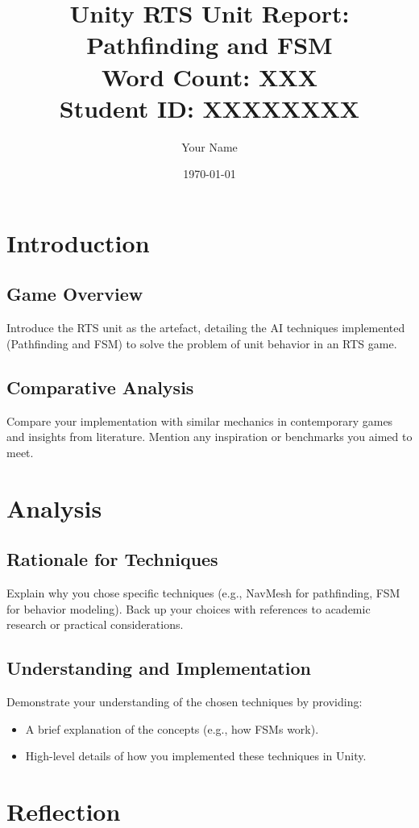 \documentclass[a4paper,12pt]{article}
\title{Unity RTS Unit Report: Pathfinding and FSM \\ \small Word Count: XXX \\ Student ID: XXXXXXXX}
\author{Your Name}
\date{\today}
\begin{document}
\maketitle
\tableofcontents
\newpage

\section{Introduction}
\subsection{Game Overview}
Introduce the RTS unit as the artefact, detailing the AI techniques implemented (Pathfinding and FSM) to solve the problem of unit behavior in an RTS game.

\subsection{Comparative Analysis}
Compare your implementation with similar mechanics in contemporary games and insights from literature. Mention any inspiration or benchmarks you aimed to meet.

\section{Analysis}
\subsection{Rationale for Techniques}
Explain why you chose specific techniques (e.g., NavMesh for pathfinding, FSM for behavior modeling). Back up your choices with references to academic research or practical considerations.

\subsection{Understanding and Implementation}
Demonstrate your understanding of the chosen techniques by providing:
\begin{itemize}
    \item A brief explanation of the concepts (e.g., how FSMs work).
    \item High-level details of how you implemented these techniques in Unity.
\end{itemize}

\section{Reflection}
\end{document}
